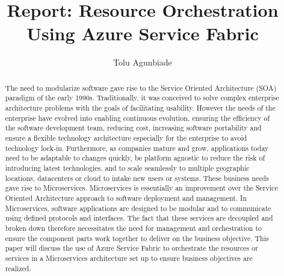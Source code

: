 

\def\paperstatus{100} %
\def\paperchapter{Azure} %
\def\hid{hid-sp18-501} %
\def\volume{9} %

\def\locator{\hid, Volume: \volume, Chapter: \paperchapter, Status: \paperstatus. \newline}

\title{Report: Resource Orchestration Using Azure Service Fabric }


\author{Tolu Agunbiade}


\renewcommand{\shortauthors}{G. v. Laszewski}


\begin{abstract}
The need to modularize software gave rise to the Service Oriented
Architecture (SOA) paradigm of the early 1990s. Traditionally, 
it was
conceived to solve complex enterprise architecture problems with the
goals of facilitating usability. However the needs of the enterprise
have evolved into enabling continuous evolution, ensuring the
efficiency of the software development team, reducing cost, increasing
software portability and ensure a flexible technology architecture
especially for the enterprise to avoid technology
lock-in. Furthermore, as companies mature and grow, applications today
need to be adaptable to changes quickly, be platform agnostic to
reduce the risk of introducing latest technologies, and to scale
seamlessly to multiple geographic locations, datacenters or cloud to
intake new users or systems. These business needs gave rise to
Microservices. Microservices is essentially an improvement over 
the Service
Oriented Architecture approach to software deployment and management.
In Microservices, software applications are
designed to be modular and to communicate using defined protocols
and interfaces. The fact that these 
services are decoupled
and broken down therefore necessitates the need for management and
orchestration to ensure the component parts work together to deliver
on the business objective. This paper will discuss the use of Azure
Service Fabric to orchestrate the resources or services in a
Microservices architecture set up to ensure business objectives are
realized.

\end{abstract}

